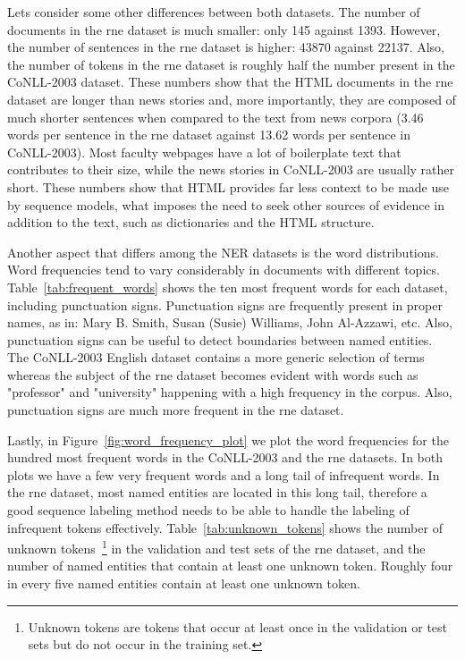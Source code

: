 \documentclass{nle}
\begin{document}
Lets consider some other differences between both datasets. 
The number of documents in the \gls{rne} dataset is much smaller: only 145 against 
1393. However, the number of sentences in the \gls{rne}
dataset is higher: 43870 against 22137. Also, the number of tokens in the \gls{rne} dataset
is roughly half the number present in the {CoNLL-2003} dataset. These numbers show that 
the HTML documents in the \gls{rne} dataset are longer than news 
stories and, more importantly, they are composed of much shorter sentences when compared 
to the text from news corpora (3.46 words per sentence in the \gls{rne} dataset
against 13.62 words per sentence in {CoNLL-2003}). Most faculty webpages have a lot of 
boilerplate text that contributes to their size, while the news stories in {CoNLL-2003}
are usually rather short. These numbers show that HTML provides far less context to be made 
use by sequence models, what imposes the need to seek other sources of evidence in addition to 
the text, such as dictionaries and the HTML structure.

Another aspect that differs among the NER datasets is the word distributions. Word frequencies
tend to vary considerably in documents with different topics. Table~\ref{tab:frequent_words}
shows the ten most frequent words for each dataset, including punctuation signs. Punctuation
signs are frequently present in proper names, as in: Mary B. Smith, Susan (Susie) Williams, John Al-Azzawi, etc.
Also, punctuation signs can be useful to detect boundaries between named entities.
The {CoNLL-2003} English dataset contains a more generic selection of terms whereas the 
subject of the \gls{rne} dataset becomes evident with words such as "professor" and "university" 
happening with a high frequency in the corpus. Also, punctuation signs are much more frequent in
the \gls{rne} dataset. 

Lastly, in Figure~\ref{fig:word_frequency_plot}
we plot the word frequencies for the hundred most frequent words in the {CoNLL-2003} and 
the \gls{rne} datasets. In both plots we have a few very frequent words and a long tail of
infrequent words. In the \gls{rne} dataset, most named entities are located in this long tail, 
therefore a good sequence labeling method needs to be able to handle the labeling of infrequent 
tokens effectively. 
Table~\ref{tab:unknown_tokens} shows the number of unknown tokens~\footnote{
Unknown tokens are tokens that occur at least once in the validation or test sets 
but do not occur in the training set.
}
in the validation and test
sets of the \gls{rne} dataset, and the number of named entities that contain at least one 
unknown token. Roughly four in every five named entities contain at least one unknown
token.
\end{document}
